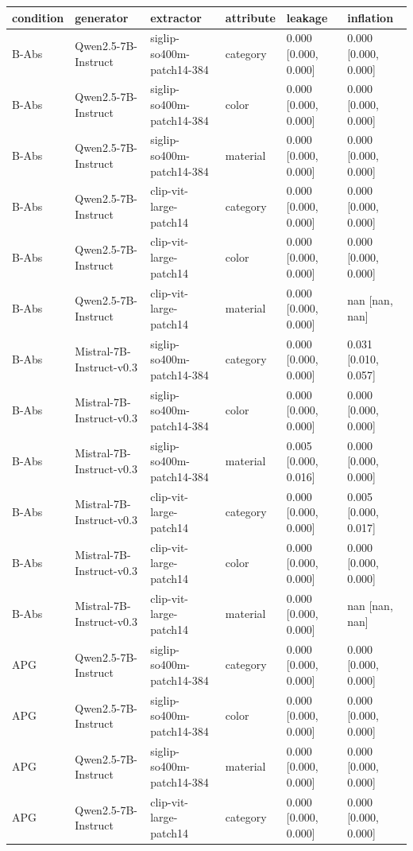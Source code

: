 \begin{tabular}{llllll}
\toprule
condition & generator & extractor & attribute & leakage & inflation \\
\midrule
B-Abs & Qwen2.5-7B-Instruct & siglip-so400m-patch14-384 & category & 0.000 [0.000, 0.000] & 0.000 [0.000, 0.000] \\
B-Abs & Qwen2.5-7B-Instruct & siglip-so400m-patch14-384 & color & 0.000 [0.000, 0.000] & 0.000 [0.000, 0.000] \\
B-Abs & Qwen2.5-7B-Instruct & siglip-so400m-patch14-384 & material & 0.000 [0.000, 0.000] & 0.000 [0.000, 0.000] \\
B-Abs & Qwen2.5-7B-Instruct & clip-vit-large-patch14 & category & 0.000 [0.000, 0.000] & 0.000 [0.000, 0.000] \\
B-Abs & Qwen2.5-7B-Instruct & clip-vit-large-patch14 & color & 0.000 [0.000, 0.000] & 0.000 [0.000, 0.000] \\
B-Abs & Qwen2.5-7B-Instruct & clip-vit-large-patch14 & material & 0.000 [0.000, 0.000] & nan [nan, nan] \\
B-Abs & Mistral-7B-Instruct-v0.3 & siglip-so400m-patch14-384 & category & 0.000 [0.000, 0.000] & 0.031 [0.010, 0.057] \\
B-Abs & Mistral-7B-Instruct-v0.3 & siglip-so400m-patch14-384 & color & 0.000 [0.000, 0.000] & 0.000 [0.000, 0.000] \\
B-Abs & Mistral-7B-Instruct-v0.3 & siglip-so400m-patch14-384 & material & 0.005 [0.000, 0.016] & 0.000 [0.000, 0.000] \\
B-Abs & Mistral-7B-Instruct-v0.3 & clip-vit-large-patch14 & category & 0.000 [0.000, 0.000] & 0.005 [0.000, 0.017] \\
B-Abs & Mistral-7B-Instruct-v0.3 & clip-vit-large-patch14 & color & 0.000 [0.000, 0.000] & 0.000 [0.000, 0.000] \\
B-Abs & Mistral-7B-Instruct-v0.3 & clip-vit-large-patch14 & material & 0.000 [0.000, 0.000] & nan [nan, nan] \\
APG & Qwen2.5-7B-Instruct & siglip-so400m-patch14-384 & category & 0.000 [0.000, 0.000] & 0.000 [0.000, 0.000] \\
APG & Qwen2.5-7B-Instruct & siglip-so400m-patch14-384 & color & 0.000 [0.000, 0.000] & 0.000 [0.000, 0.000] \\
APG & Qwen2.5-7B-Instruct & siglip-so400m-patch14-384 & material & 0.000 [0.000, 0.000] & 0.000 [0.000, 0.000] \\
APG & Qwen2.5-7B-Instruct & clip-vit-large-patch14 & category & 0.000 [0.000, 0.000] & 0.000 [0.000, 0.000] \\

\end{tabular}
